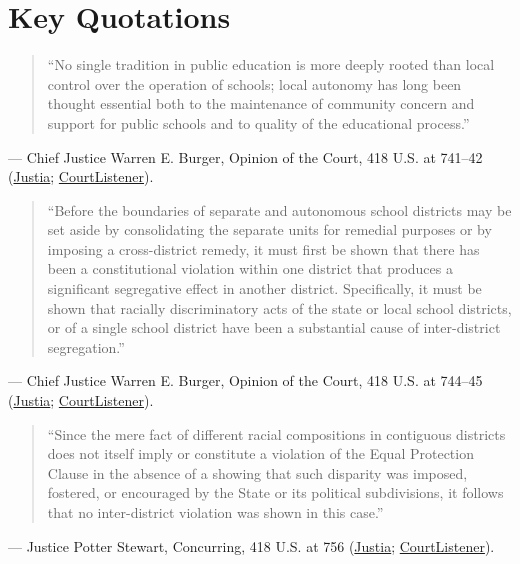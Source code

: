 \documentclass[12pt]{article}
\begin{document}
\section{Key Quotations}
\begin{quote}
``No single tradition in public education is more deeply rooted than local control over the operation of schools; local autonomy has long been thought essential both to the maintenance of community concern and support for public schools and to quality of the educational process.''
\end{quote}
\noindent --- Chief Justice Warren E. Burger, Opinion of the Court, 418 U.S. at 741--42 (\href{https://supreme.justia.com/cases/federal/us/418/717/}{Justia}; \href{https://www.courtlistener.com/opinion/109102/milliken-v-bradley/}{CourtListener}).

\begin{quote}
``Before the boundaries of separate and autonomous school districts may be set aside by consolidating the separate units for remedial purposes or by imposing a cross-district remedy, it must first be shown that there has been a constitutional violation within one district that produces a significant segregative effect in another district. Specifically, it must be shown that racially discriminatory acts of the state or local school districts, or of a single school district have been a substantial cause of inter-district segregation.''
\end{quote}
\noindent --- Chief Justice Warren E. Burger, Opinion of the Court, 418 U.S. at 744--45 (\href{https://supreme.justia.com/cases/federal/us/418/717/}{Justia}; \href{https://www.courtlistener.com/opinion/109102/milliken-v-bradley/}{CourtListener}).

\begin{quote}
``Since the mere fact of different racial compositions in contiguous districts does not itself imply or constitute a violation of the Equal Protection Clause in the absence of a showing that such disparity was imposed, fostered, or encouraged by the State or its political subdivisions, it follows that no inter-district violation was shown in this case.''
\end{quote}
\noindent --- Justice Potter Stewart, Concurring, 418 U.S. at 756 (\href{https://supreme.justia.com/cases/federal/us/418/717/}{Justia}; \href{https://www.courtlistener.com/opinion/109102/milliken-v-bradley/}{CourtListener}).
\end{document}
